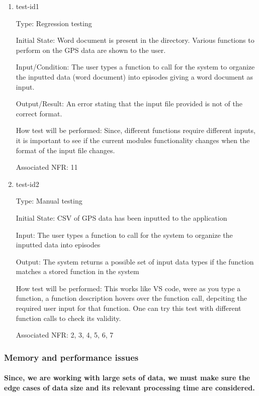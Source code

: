 \documentclass[12pt, titlepage]{article}
\begin{document}
\begin{enumerate}

\item{test-id1\\}

Type: Regression testing
					
Initial State: Word document is present in the directory. Various functions to perform on the GPS data are shown to the user.
					
Input/Condition: The user types a function to call for the system to organize the
inputted data (word document) into episodes giving a word document as input. 
					
Output/Result: An error stating that the input file provided is not of the correct format.
					
How test will be performed: Since, different functions require different inputs, it is important to see if the current modules functionality changes when the format of the input file changes.

Associated NFR: 11
\item{test-id2\\}

Type: Manual testing
					
Initial State: CSV of GPS data has been inputted to the application
					
Input: The user types a function to call for the system to organize the
inputted data into episodes
					
Output: The system returns a possible set of input data types if the function matches a stored function in the system
					
How test will be performed: This works like VS code, were as you type a function, a function description hovers over the function call, depciting the required user input for that function. One can try this test with different function calls to check its validity.

Associated NFR: 2, 3, 4, 5, 6, 7 
\end{enumerate}

\subsubsection{Memory and performance issues}
\paragraph{Since, we are working with large sets of data, we must make sure the edge cases of data size and its relevant processing time are considered. }
\end{document}
